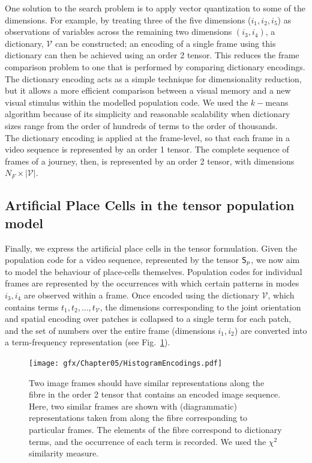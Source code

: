 One solution to the search problem is to apply vector quantization to some of the dimensions.  For example, by treating three of the five dimensions ($i_1,i_2,i_5$) as observations of variables across the remaining two dimensions $(i_3,i_4)$, a dictionary, $\mathcal{V}$ can be constructed; an encoding of a single frame using this dictionary can then be achieved using an order 2 tensor.  This reduces the frame comparison problem to one that is performed by comparing dictionary encodings. The dictionary encoding acts as a simple technique for dimensionality reduction, but it allows a more efficient comparison between a visual memory and a new visual stimulus within the modelled population code. We used the $k-$means algorithm because of its simplicity and reasonable scalability when dictionary sizes range from the order of hundreds of terms to the order of thousands.\\

The dictionary encoding is applied at the frame-level, so that each frame in a video sequence is represented by an order 1 tensor.  The complete sequence of frames of a journey, then, is represented by an order 2 tensor, with dimensions $N_F\times|\mathcal{V}|.$ 


\subsection{Artificial Place Cells in the tensor population model}
\label{sec:APC}

Finally, we express the artificial place cells in the tensor formulation. Given the population code for a video sequence, represented by the tensor $\mathsf{S}_p$, we now aim to model the behaviour of place-cells themselves.   Population codes for individual frames are represented by the occurrences with which certain patterns in modes $i_3,i_4$ are observed within a frame.   Once encoded using the dictionary $\mathcal{V}$, which contains terms $t_1,t_2,...,t_{\mathcal{V}}$, the dimensions corresponding to the joint orientation and spatial encoding over patches is collapsed to a single term for each patch, and the set of numbers over the entire frame (dimensions $i_1,i_2$) are converted into a term-frequency representation \cite{Wu:2008} (see Fig.~\ref{fig:HistEncodings}).

\begin{figure}
\centering
\texttt{[image: gfx/Chapter05/HistogramEncodings.pdf]}
\caption{Two image frames should have similar representations along the fibre in the order 2 tensor that contains an encoded image sequence.  Here, two similar frames are shown with (diagrammatic) representations taken from along the fibre corresponding to particular frames.  The elements of the fibre correspond to dictionary terms, and the occurrence of each term is recorded.  We used the $\chi^2$ similarity measure.}
\label{fig:HistEncodings}
\end{figure}


